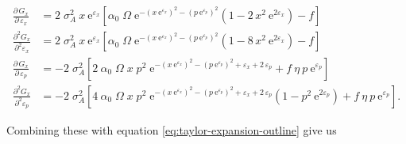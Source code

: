 \begin{equation*}
\begin{split}
    \frac{\partial \, G_x}{\partial \, \varepsilon_{x}} &= 2 \; \sigma_A^2 \: x \: \text{e}^{\varepsilon_{x}}
    \left[
        \alpha_0 \; \Omega \;
            \text{e}^{-(x \: \text{e}^{\varepsilon_{x}})^2 - (p \: \text{e}^{\varepsilon_{p}})^2}
            \left(
                1 - 2 \, x^2 \: \text{e}^{2 \varepsilon_{x}}
            \right)
        - f
    \right] \\
% 
    \frac{\partial^2 G_x}{\partial^2 \varepsilon_{x}} &= 2 \; \sigma_A^2 \: x \: \text{e}^{\varepsilon_{x}}
    \left[
        \alpha_0 \; \Omega \;
            \text{e}^{-(x \: \text{e}^{\varepsilon_{x}})^2 - (p \: \text{e}^{\varepsilon_{p}})^2}
            \left(
                1 - 8 \, x^2 \: \text{e}^{2 \varepsilon_{x}}
            \right)
        - f
    \right] \\[2ex]
%
%
    \frac{\partial \, G_x}{\partial \, \varepsilon_{p}} &= - 2 \; \sigma_A^2
    \left[
        2 \: \alpha_0 \; \Omega \; x \; p^2 \;
            \text{e}^{-(x \: \text{e}^{\varepsilon_{x}})^2 - (p \: \text{e}^{\varepsilon_{p}})^2 + \varepsilon_{x} + 2 \, \varepsilon_{p}}
        + f \: \eta \: p \: \text{e}^{\varepsilon_{p}}
    \right] \\
% 
    \frac{\partial^2 G_x}{\partial^2 \varepsilon_{p}} &= - 2 \; \sigma_A^2
    \left[
        4 \: \alpha_0 \; \Omega \; x \; p^2 \;
            \text{e}^{-(x \: \text{e}^{\varepsilon_{x}})^2 - (p \: \text{e}^{\varepsilon_{p}})^2 + \varepsilon_{x} + 2 \, \varepsilon_{p}}
            \left(
                1 - p^2 \: \text{e}^{2 \varepsilon_{p}}
            \right)
        + f \: \eta \: p \: \text{e}^{\varepsilon_{p}}
    \right]
\text{.}
\end{split}
\end{equation*}


Combining these with equation \ref{eq:taylor-expansion-outline} give us 

